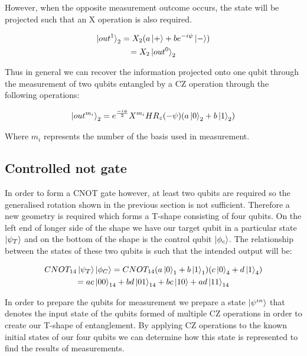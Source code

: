 However, when the opposite measurement outcome occurs, the state will be projected such that an X operation is also required. 

\begin{multline}
\ket{out^{1}}_{2} = X_{2} (a \ket{+} + b e^{-i \psi} \ket{-}) \\
= X_{2} \ket{out^{0}}_{2} \\
\end{multline}

Thus in general we can recover the information projected onto one qubit through the measurement of two qubits entangled by a CZ operation through the following operations:

\begin{equation}
\label{eq:one_qbit_feed_forward}
\ket{out^{m_{i}}}_{2} = e^{\frac{-i \psi}{2}} X^{m_{i}} H R_{z} (-\psi) (a \ket{0}_{2} + b \ket{1}_{2}) 
\end{equation}

Where $m_{i}$ represents the number of the basis used in measurement. 


\subsection{Controlled not gate}

In order to form a CNOT gate however, at least two qubits are required so the generalised rotation shown in the previous section is not sufficient. Therefore a new geometry is required which forms a T-shape consisting of four qubits. On the left end of longer side of the shape we have our target qubit in a particular state $\ket{\psi_{T}}$ and on the bottom of the shape is the control qubit $\ket{\phi_{c}}$. The relationship between the states of these two qubits is such that the intended output will be:

\begin{multline}
\label{eq:cnot}
CNOT_{14} \ket{\psi_{T}} \ket{\phi_{C}} = CNOT_{14} (a \ket{0}_{1} + b \ket{1}_{1}) (c \ket{0}_{4} + d \ket{1}_{4}) \\
= ac \ket{00}_{14} + bd \ket{01}_{14} + bc \ket{10} + ad \ket{11}_{14} \\
\end{multline}

In order to prepare the qubits for measurement we prepare a state $\ket{\psi^{in}}$ that denotes the input state of the qubits formed of multiple CZ operations in order to create our T-shape of entanglement. By applying CZ operations to the known initial states of our four qubits we can determine how this state is represented to find the results of measurements.

